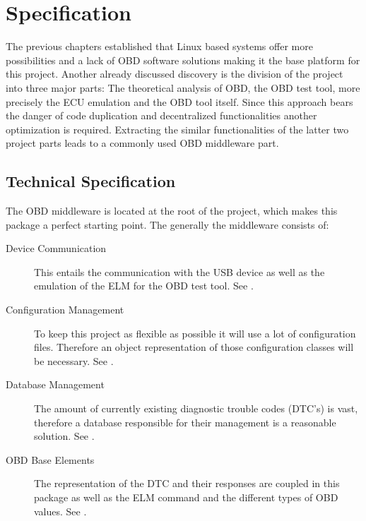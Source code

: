 

\chapter{Specification}
The previous chapters established that Linux based systems offer more possibilities and a lack of OBD software solutions making it the base platform 
for this project. Another already discussed discovery is the division of the project into three major parts: The theoretical analysis of OBD, the 
OBD test tool, more precisely the ECU emulation and the OBD tool itself. Since this approach bears the danger of code duplication and decentralized 
functionalities another optimization is required.  Extracting the similar functionalities of the latter two project parts leads to a 
commonly used OBD middleware part. 

\section{Technical Specification}
The OBD middleware is located at the root of the project, which makes this package a perfect starting point. The 
generally the middleware consists of:

\begin{description}
\item[Device Communication]

This entails the communication with the USB device as well as the emulation of the ELM for the OBD test tool. See .
\item[Configuration Management]

To keep this project as flexible as possible it will use a lot of configuration files. Therefore an object representation of those configuration 
classes will be necessary. See .
\item[Database Management]

The amount of currently existing diagnostic trouble codes (DTC’s) is vast, therefore a database responsible for their management is a reasonable 
solution. See .
\item[OBD Base Elements]

The representation of the DTC and their responses are coupled in this package as well as the ELM command and the different types of OBD values. 
See .
\end{description}

